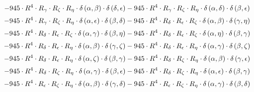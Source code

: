 \begin{subequations}
\begin{gather}
 \\[0.2em] \notag 		 - 945 \cdot R^{4} \cdot R_{\gamma{}} \cdot R_{\zeta{}} \cdot R_{\eta{}} \cdot \delta{}\left(\alpha{}, \beta{}\right) \cdot \delta{}\left(\delta{}, \epsilon{}\right)- 945 \cdot R^{4} \cdot R_{\gamma{}} \cdot R_{\zeta{}} \cdot R_{\eta{}} \cdot \delta{}\left(\alpha{}, \delta{}\right) \cdot \delta{}\left(\beta{}, \epsilon{}\right) 
 \\[0.2em] \notag 		 - 945 \cdot R^{4} \cdot R_{\gamma{}} \cdot R_{\zeta{}} \cdot R_{\eta{}} \cdot \delta{}\left(\alpha{}, \epsilon{}\right) \cdot \delta{}\left(\beta{}, \delta{}\right)- 945 \cdot R^{4} \cdot R_{\delta{}} \cdot R_{\epsilon{}} \cdot R_{\zeta{}} \cdot \delta{}\left(\alpha{}, \beta{}\right) \cdot \delta{}\left(\gamma{}, \eta{}\right) 
 \\[0.2em] \notag 		 - 945 \cdot R^{4} \cdot R_{\delta{}} \cdot R_{\epsilon{}} \cdot R_{\zeta{}} \cdot \delta{}\left(\alpha{}, \gamma{}\right) \cdot \delta{}\left(\beta{}, \eta{}\right)- 945 \cdot R^{4} \cdot R_{\delta{}} \cdot R_{\epsilon{}} \cdot R_{\zeta{}} \cdot \delta{}\left(\alpha{}, \eta{}\right) \cdot \delta{}\left(\beta{}, \gamma{}\right) 
 \\[0.2em] \notag 		 - 945 \cdot R^{4} \cdot R_{\delta{}} \cdot R_{\epsilon{}} \cdot R_{\eta{}} \cdot \delta{}\left(\alpha{}, \beta{}\right) \cdot \delta{}\left(\gamma{}, \zeta{}\right)- 945 \cdot R^{4} \cdot R_{\delta{}} \cdot R_{\epsilon{}} \cdot R_{\eta{}} \cdot \delta{}\left(\alpha{}, \gamma{}\right) \cdot \delta{}\left(\beta{}, \zeta{}\right) 
 \\[0.2em] \notag 		 - 945 \cdot R^{4} \cdot R_{\delta{}} \cdot R_{\epsilon{}} \cdot R_{\eta{}} \cdot \delta{}\left(\alpha{}, \zeta{}\right) \cdot \delta{}\left(\beta{}, \gamma{}\right)- 945 \cdot R^{4} \cdot R_{\delta{}} \cdot R_{\zeta{}} \cdot R_{\eta{}} \cdot \delta{}\left(\alpha{}, \beta{}\right) \cdot \delta{}\left(\gamma{}, \epsilon{}\right) 
 \\[0.2em] \notag 		 - 945 \cdot R^{4} \cdot R_{\delta{}} \cdot R_{\zeta{}} \cdot R_{\eta{}} \cdot \delta{}\left(\alpha{}, \gamma{}\right) \cdot \delta{}\left(\beta{}, \epsilon{}\right)- 945 \cdot R^{4} \cdot R_{\delta{}} \cdot R_{\zeta{}} \cdot R_{\eta{}} \cdot \delta{}\left(\alpha{}, \epsilon{}\right) \cdot \delta{}\left(\beta{}, \gamma{}\right) 
 \\[0.2em] \notag 		 - 945 \cdot R^{4} \cdot R_{\epsilon{}} \cdot R_{\zeta{}} \cdot R_{\eta{}} \cdot \delta{}\left(\alpha{}, \beta{}\right) \cdot \delta{}\left(\gamma{}, \delta{}\right)- 945 \cdot R^{4} \cdot R_{\epsilon{}} \cdot R_{\zeta{}} \cdot R_{\eta{}} \cdot \delta{}\left(\alpha{}, \gamma{}\right) \cdot \delta{}\left(\beta{}, \delta{}\right) 

\end{gather}
\end{subequations}
